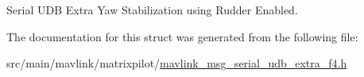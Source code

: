 Serial U\+D\+B Extra Yaw Stabilization using Rudder Enabled. 



The documentation for this struct was generated from the following file\+:\begin{DoxyCompactItemize}
\item 
src/main/mavlink/matrixpilot/\hyperlink{mavlink__msg__serial__udb__extra__f4_8h}{mavlink\+\_\+msg\+\_\+serial\+\_\+udb\+\_\+extra\+\_\+f4.\+h}\end{DoxyCompactItemize}
